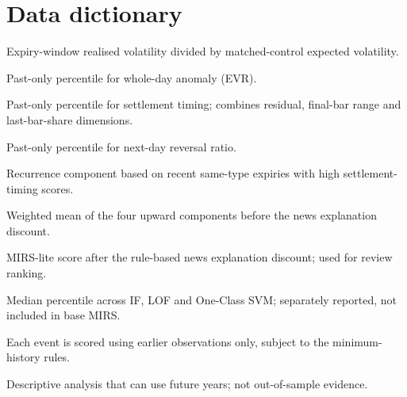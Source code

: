 \documentclass[11pt,a4paper]{article}
\begin{document}
\section{Data dictionary}
\begin{description}[style=nextline]
\item[EVR] Expiry-window realised volatility divided by matched-control expected volatility.
\item[$A$] Past-only percentile for whole-day anomaly (EVR).
\item[$T$] Past-only percentile for settlement timing; combines residual, final-bar range and last-bar-share dimensions.
\item[$R$] Past-only percentile for next-day reversal ratio.
\item[$Rec$] Recurrence component based on recent same-type expiries with high settlement-timing scores.
\item[$U$] Weighted mean of the four upward components before the news explanation discount.
\item[MIRS] MIRS-lite score after the rule-based news explanation discount; used for review ranking.
\item[ML consensus] Median percentile across IF, LOF and One-Class SVM; separately reported, not included in base MIRS.
\item[Walk-forward] Each event is scored using earlier observations only, subject to the minimum-history rules.
\item[Retrospective] Descriptive analysis that can use future years; not out-of-sample evidence.
\end{description}
\end{document}
